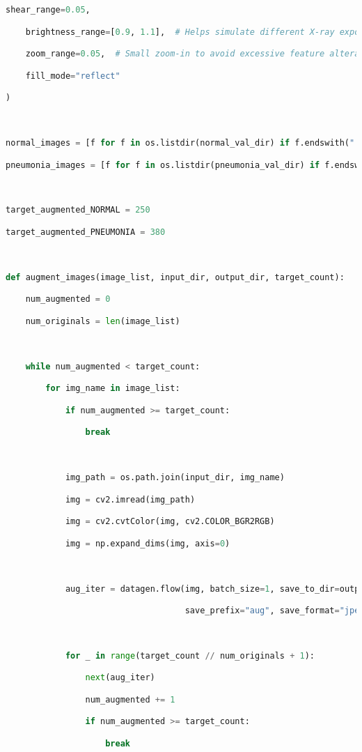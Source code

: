\documentclass{article}
\begin{document}
\begin{lstlisting}[style=mystyle,language=Python]
    shear_range=0.05,

    brightness_range=[0.9, 1.1],  # Helps simulate different X-ray exposures

    zoom_range=0.05,  # Small zoom-in to avoid excessive feature alteration

    fill_mode="reflect"

)



normal_images = [f for f in os.listdir(normal_val_dir) if f.endswith(".jpeg")]

pneumonia_images = [f for f in os.listdir(pneumonia_val_dir) if f.endswith(".jpeg")]



target_augmented_NORMAL = 250

target_augmented_PNEUMONIA = 380



def augment_images(image_list, input_dir, output_dir, target_count):

    num_augmented = 0

    num_originals = len(image_list)



    while num_augmented < target_count:

        for img_name in image_list:

            if num_augmented >= target_count:

                break



            img_path = os.path.join(input_dir, img_name)

            img = cv2.imread(img_path)

            img = cv2.cvtColor(img, cv2.COLOR_BGR2RGB)

            img = np.expand_dims(img, axis=0)



            aug_iter = datagen.flow(img, batch_size=1, save_to_dir=output_dir,

                                    save_prefix="aug", save_format="jpeg")



            for _ in range(target_count // num_originals + 1):

                next(aug_iter)

                num_augmented += 1

                if num_augmented >= target_count:

                    break




\end{lstlisting}
\end{document}

